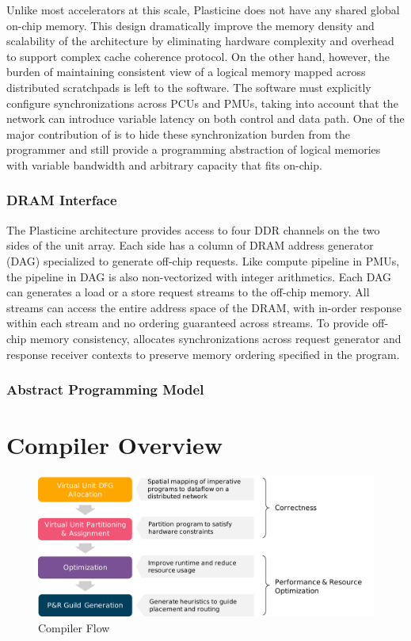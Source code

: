 Unlike most accelerators at this scale, Plasticine does not have any shared global on-chip memory. 
This design dramatically improve the memory density and scalability of the architecture 
by eliminating hardware complexity and overhead to support complex cache coherence protocol.
On the other hand, however, the burden of maintaining consistent view of a logical memory mapped
across distributed scratchpads is left to the software.
The software must explicitly configure synchronizations across PCUs and PMUs, taking into account
that the network can introduce variable latency on both control and data path.
One of the major contribution of \name is to hide these synchronization burden from the programmer
and still provide a programming abstraction of logical memories with variable bandwidth and 
arbitrary capacity that fits on-chip.

\subsubsection{DRAM Interface}
The Plasticine architecture provides access to four DDR channels on the two sides of the
unit array. Each side has a column of DRAM address generator (DAG) specialized to generate off-chip
requests. Like compute pipeline in PMUs, the pipeline in DAG is also non-vectorized with integer
arithmetics. Each DAG can generates a load or a store request streams to the off-chip memory. All
streams can access the entire address space of the DRAM, with in-order response within each stream
and no ordering guaranteed across streams. To provide off-chip memory consistency, \name allocates
synchronizations across request generator and response receiver contexts to preserve memory ordering
specified in the program.

\subsubsection{Abstract Programming Model}

\section{Compiler Overview}

\begin{figure}
\centering
\includegraphics[width=1\textwidth]{figs/sarastack.pdf}
\caption[\name Compiler Flow]{\name Compiler Flow}
\label{fig:flow}
\end{figure}
 
